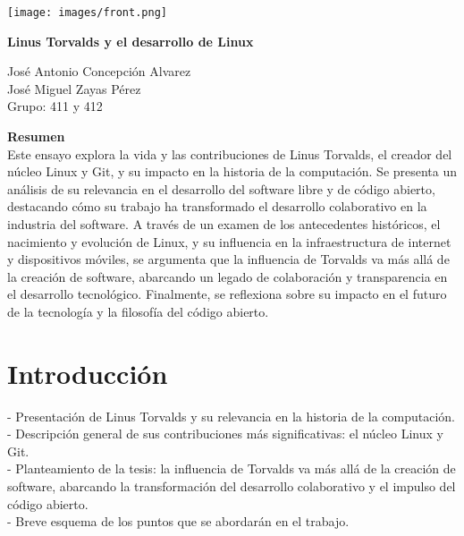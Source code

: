 \documentclass[a4paper,12pt]{article}
\begin{document}

\begin{titlepage}
    \centering
    
    \texttt{[image: images/front.png]} %
    
    \vspace{1cm}
    \newpage
    
    {\Huge \textbf{Linus Torvalds y el desarrollo de Linux}}\\
    \vspace{0.5cm}
    
    {\Large José Antonio Concepción Alvarez \\  José Miguel Zayas Pérez \\ Grupo: 411 y 412}
    
    
   \thispagestyle{empty} 
\end{titlepage}

\begin{centering}
    \vspace{2cm}
    \textbf{Resumen}\\
    Este ensayo explora la vida y las contribuciones de Linus Torvalds, el
    creador del núcleo Linux y Git, y su impacto en la historia de la
    computación. Se presenta un análisis de su relevancia en el desarrollo del
    software libre y de código abierto, destacando cómo su trabajo ha
    transformado el desarrollo colaborativo en la industria del software. A
    través de un examen de los antecedentes históricos, el nacimiento y
    evolución de Linux, y su influencia en la infraestructura de internet y
    dispositivos móviles, se argumenta que la influencia de Torvalds va más allá
    de la creación de software, abarcando un legado de colaboración y
    transparencia en el desarrollo tecnológico. Finalmente, se reflexiona sobre
    su impacto en el futuro de la tecnología y la filosofía del código abierto.
\end{centering}
\newpage

\tableofcontents
\newpage

\section{Introducción} - Presentación de Linus Torvalds y su relevancia en la
historia de la computación.\\ - Descripción general de sus contribuciones más
significativas: el núcleo Linux y Git.\\ - Planteamiento de la tesis: la
influencia de Torvalds va más allá de la creación de software, abarcando la
transformación del desarrollo colaborativo y el impulso del código abierto.\\ -
Breve esquema de los puntos que se abordarán en el trabajo.
\end{document}
